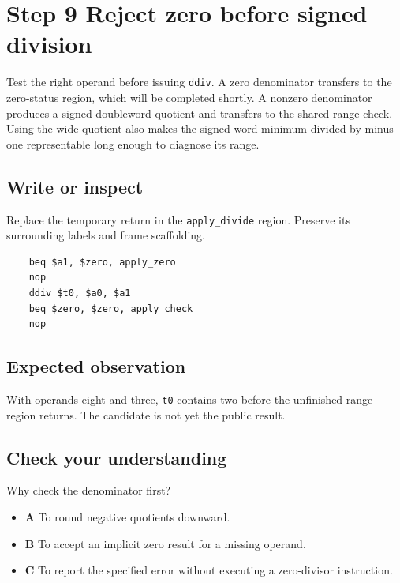 \section{Step 9 Reject zero before signed division}\label{expression-s09}

Test the right operand before issuing \texttt{ddiv}. A zero denominator transfers to the zero-status region, which will be completed shortly. A nonzero denominator produces a signed doubleword quotient and transfers to the shared range check. Using the wide quotient also makes the signed-word minimum divided by minus one representable long enough to diagnose its range.

\subsection{Write or inspect}
Replace the temporary return in the \texttt{apply\_divide} region. Preserve its surrounding labels and frame scaffolding.

\begin{verbatim}
    beq $a1, $zero, apply_zero
    nop
    ddiv $t0, $a0, $a1
    beq $zero, $zero, apply_check
    nop
\end{verbatim}
\subsection{Expected observation}
With operands eight and three, \texttt{t0} contains two before the unfinished range region returns. The candidate is not yet the public result.

\subsection{Check your understanding}
Why check the denominator first?

\begin{itemize}
  \item \textbf{A} To round negative quotients downward.
  \item \textbf{B} To accept an implicit zero result for a missing operand.
  \item \textbf{C} To report the specified error without executing a zero-divisor instruction.
\end{itemize}
